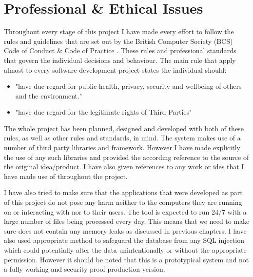 \chapter{Professional \& Ethical Issues}
Throughout every stage of this project I have made every effort to follow the rules and guidelines that are set out by the British Computer Society (BCS) Code of Conduct \& Code of Practice \cite{bcsCodeOfConduct}. These rules and professional standards that govern the individual decisions and behaviour. The main rule that apply almost to every software development project states the individual should:
\begin{itemize}
	\item "have due regard for public health, privacy, security and wellbeing of others and
the environment."
	\item "have due regard for the legitimate rights of Third Parties"
\end{itemize}

The whole project has been planned, designed and developed with both of these rules, as well as other rules and standards, in mind. The system makes use of a number of third party libraries and framework. However I have made explicitly the use of any such libraries and provided the according reference to the source of the original idea/product. I have also given references to any work or ides that I have made use of throughout the project.

I have also tried to make sure that the applications that were developed as part of this project do not pose any harm neither to the computers they are running on or interacting with nor to their users. The tool is expected to run 24/7 with a large number of files being processed every day. This means that we need to make sure does not contain any memory leaks as discussed in previous chapters. I have also used appropriate method to safeguard the database from any SQL injection \cite{Su2006} which could potentially alter the data unintentionally or without the appropriate permission. However it should be noted that this is a prototypical system and not a fully working and security proof production version.
